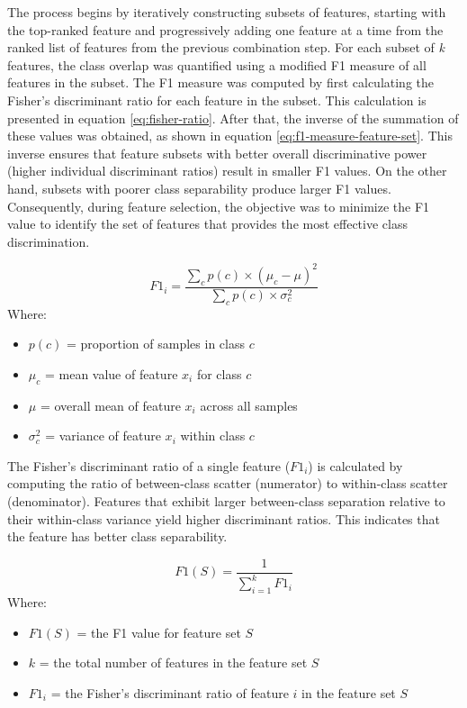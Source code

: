 The process begins by iteratively constructing subsets of features, starting with the top-ranked feature and progressively adding one feature at a time from the ranked list of features from the previous combination step. For each subset of \textit{k} features, the class overlap was quantified using a modified F1 measure of all features in the subset. The F1 measure was computed by first calculating the Fisher's discriminant ratio for each feature in the subset. This calculation is presented in equation \eqref{eq:fisher-ratio}. After that, the inverse of the summation of these values was obtained, as shown in equation \eqref{eq:f1-measure-feature-set}. This inverse ensures that feature subsets with better overall discriminative power (higher individual discriminant ratios) result in smaller F1 values. On the other hand, subsets with poorer class separability produce larger F1 values. Consequently, during feature selection, the objective was to minimize the F1 value to identify the set of features that provides the most effective class discrimination.

\begin{equation}
    F1_i = \frac{\sum_c p(c) \times (\mu_c - \mu)^2}{\sum_c p(c) \times \sigma_c^2}
    \label{eq:fisher-ratio}
\end{equation}
Where:
\begin{itemize}
    \item $p(c)$ = proportion of samples in class $c$
    \item $\mu_c$ = mean value of feature $x_i$ for class $c$
    \item $\mu$ = overall mean of feature $x_i$ across all samples
    \item $\sigma_c^2$ = variance of feature $x_i$ within class $c$
\end{itemize}
\vspace{2em}

The Fisher's discriminant ratio of a single feature ($F1_i$) is calculated by computing the ratio of between-class scatter (numerator) to within-class scatter (denominator). Features that exhibit larger between-class separation relative to their within-class variance yield higher discriminant ratios. This indicates that the feature has better class separability.

\begin{equation}
    F1(S) = \frac{1}{\sum_{i=1}^{k} F1_i}
    \label{eq:f1-measure-feature-set}
\end{equation}
Where:
\begin{itemize}
    \item $F1(S)$ = the F1 value for feature set $S$
    \item $k$ = the total number of features in the feature set $S$
    \item $F1_i$ = the Fisher's discriminant ratio of feature $i$ in the feature set $S$
\end{itemize}
\vspace{2em}

